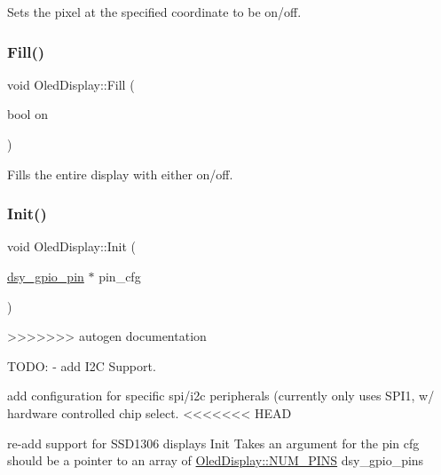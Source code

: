 Sets the pixel at the specified coordinate to be on/off. \mbox{\label{classdaisy_1_1_oled_display_ac18ff23447781c6459d56401c1c06a02}} 
\subsubsection{\texorpdfstring{Fill()}{Fill()}}
{\footnotesize\ttfamily void Oled\+Display\+::\+Fill (\begin{DoxyParamCaption}\item[{bool}]{on }\end{DoxyParamCaption})}

Fills the entire display with either on/off. \mbox{\label{classdaisy_1_1_oled_display_ae8a15361a83969f01e551c02e793563c}} 
\subsubsection{\texorpdfstring{Init()}{Init()}}
{\footnotesize\ttfamily void Oled\+Display\+::\+Init (\begin{DoxyParamCaption}\item[{\hyperlink{structdsy__gpio__pin}{dsy\+\_\+gpio\+\_\+pin} $\ast$}]{pin\+\_\+cfg }\end{DoxyParamCaption})}
>>>>>>> autogen documentation

T\+O\+DO\+: -\/ add I2C Support.
\begin{DoxyItemize}
\item add configuration for specific spi/i2c peripherals (currently only uses S\+P\+I1, w/ hardware controlled chip select.
<<<<<<< HEAD
\item re-\/add support for S\+S\+D1306 displays Init Takes an argument for the pin cfg  should be a pointer to an array of \hyperlink{classdaisy_1_1_oled_display_ac1e198fa97a58fbe1ff24a06c621c2cfaaa81b094c752fe9ddfe072d54003ee1f}{Oled\+Display\+::\+N\+U\+M\+\_\+\+P\+I\+NS} dsy\+\_\+gpio\+\_\+pins 
\end{DoxyItemize}\mbox{\label{classdaisy_1_1_oled_display_a6464c4429950b9d3ebe3ceedc9edb606}} 
